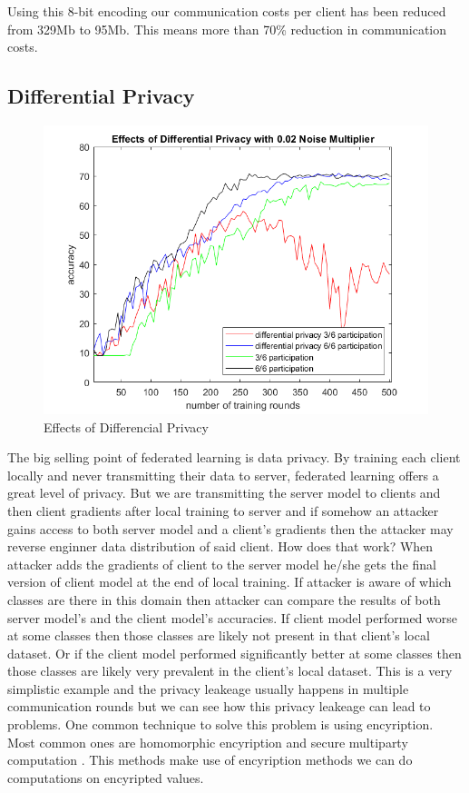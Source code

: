 \documentclass[11pt]{article}
\begin{document}
\par Using this 8-bit encoding our communication costs per client has been reduced from 329Mb to 95Mb. This means more than 70\% reduction in communication costs.

\subsection{Differential Privacy}

\begin{figure}[h!]
\centering
  \includegraphics[scale=0.5]{diff}
  \caption{Effects of Differencial Privacy}
  \label{fig:diff}
\end{figure}

\par The big selling point of federated learning is data privacy. By training each client locally and never transmitting their data to server, federated learning offers a great level of privacy. But we are transmitting the server model to clients and then client gradients after local training to server and if somehow an attacker gains access to both server model and a client’s gradients then the attacker may reverse enginner data distribution of said client. How does that work? When attacker adds the gradients of client to the server model he/she gets the final version of client model at the end of local training. If attacker is aware of which classes are there in this domain then attacker can compare the results of both server model’s and the client model’s accuracies. If client model performed worse at some classes then those classes are likely not present in that client’s local dataset. Or if the client model performed significantly better at some classes then those classes are likely very prevalent in the client’s local dataset. This is a very simplistic example and the privacy leakeage usually happens in multiple communication rounds \cite{advancesAndOpenProblems} but we can see how this privacy leakeage can lead to problems.  One common technique to solve this problem is using encyription. Most common ones are homomorphic encyription \cite{HE} and secure multiparty computation \cite{SMC}. This methods make use of encyription methods we can do computations on encyripted values. 
\end{document}
